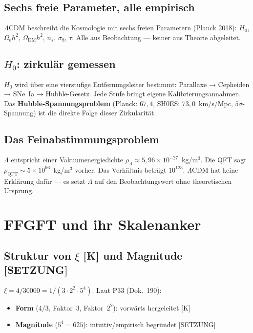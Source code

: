 \documentclass[11pt]{report}
\begin{document}
\section{Sechs freie Parameter, alle empirisch}

$\Lambda$CDM beschreibt die Kosmologie mit sechs freien Parametern
(Planck 2018): $H_0$, $\Omega_b h^2$, $\Omega_\text{DM} h^2$, $n_s$,
$\sigma_8$, $\tau$. Alle aus Beobachtung — keiner aus Theorie abgeleitet.

\section{$H_0$: zirkulär gemessen}

$H_0$ wird über eine vierstufige Entfernungsleiter bestimmt:
Parallaxe → Cepheiden → SNe~Ia → Hubble-Gesetz. Jede Stufe bringt
eigene Kalibrierungsannahmen. Das \textbf{Hubble-Spannungsproblem}
(Planck: $67{,}4$, SH0ES: $73{,}0$~km/s/Mpc, $5\sigma$-Spannung) ist
die direkte Folge dieser Zirkularität.

\section{Das Feinabstimmungsproblem}

$\Lambda$ entspricht einer Vakuumenergiedichte
$\rho_\Lambda \approx 5{,}96\times10^{-27}$~kg/m$^3$.
Die QFT sagt $\rho_\text{QFT} \sim 5\times10^{96}$~kg/m$^3$ vorher.
Das Verhältnis beträgt $10^{123}$. $\Lambda$CDM hat keine Erklärung
dafür — es setzt $\Lambda$ auf den Beobachtungswert ohne
theoretischen Ursprung.

\chapter{FFGFT und ihr Skalenanker}

\section{Struktur von $\xi$ [K] und Magnitude [SETZUNG]}

$\xi = 4/30000 = 1/(3\cdot2^2\cdot5^4)$.
Laut P33 (Dok.~190):

\begin{itemize}
  \item \textbf{Form} ($4/3$, Faktor~3, Faktor~$2^2$): vorwärts hergeleitet [K]
  \item \textbf{Magnitude} ($5^4 = 625$): intuitiv/empirisch begründet [SETZUNG]
\end{itemize}
\end{document}
